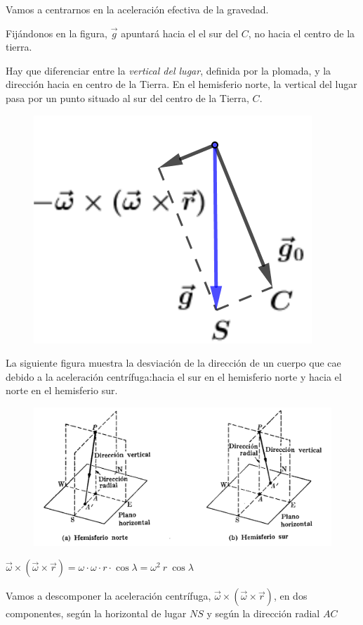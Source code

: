 Vamos a centrarnos en la aceleración efectiva de la gravedad.

\begin{multicols}{2}
Fijándonos en la figura, $\vec g$ apuntará hacia el el sur del $C$, no hacia el centro de la tierra.

Hay que diferenciar entre la \emph{vertical del lugar}, definida por la plomada, y la dirección hacia en centro de la Tierra. En el hemisferio norte, la vertical del lugar pasa por un punto situado al sur del centro de la Tierra, $C$. 
\begin{figure}[H]
	\centering
	\includegraphics[width=.45\textwidth]{imagenes/imagenes11/T11IM02.png}
\end{figure}
\end{multicols}

La siguiente figura muestra la desviación de la dirección de un cuerpo que cae debido a la aceleración centrífuga:hacia el sur en el hemisferio norte y hacia el norte en el hemisferio sur.

\begin{figure}[H]
	\centering
	\includegraphics[width=1\textwidth]{imagenes/imagenes11/T11IM08.png}
\end{figure}


$\vec \omega \times (\vec \omega \times \vec r)= \omega \cdot \omega \cdot r \cdot \cos \lambda =\omega^2 \ r \ \cos \lambda$

Vamos a descomponer la aceleración centrífuga, $\vec \omega \times (\vec \omega \times \vec r)$, en dos componentes, según la horizontal de lugar $NS$ y según la dirección radial $AC$

